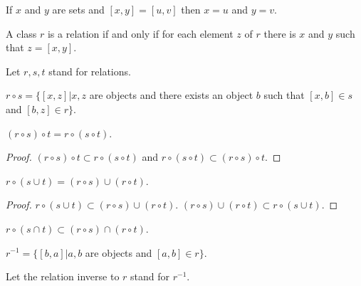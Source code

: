 \documentclass[a4paper,draft]{amsproc}
\begin{document}
\begin{forthel}
\begin{theorem}
If $x$ and $y$ are sets and $[x,y] = [u,v]$ then
$x = u$ and $y = v$.
\end{theorem}


\begin{definition} 
A class $r$ is a relation if and only if for each element $z$ of $r$
there is $x$ and $y$ such that $z = [x,y]$.
\end{definition}

Let $r, s, t$ stand for relations.

\begin{definition}
$r \circ s = \{[x,z] | x, z$ are objects and there exists an object $b$ 
such that $[x,b] \in s$ and $[b,z] \in r\}$. 
\end{definition}

\begin{theorem}
$(r \circ s) \circ t = r \circ (s \circ t)$.
\end{theorem}
\begin{proof}
$(r \circ s) \circ t \subset r \circ (s \circ t)$ and
$r \circ (s \circ t) \subset (r \circ s) \circ t$.
\end{proof}

\begin{theorem}
$r \circ (s \cup t) = (r \circ s) \cup (r \circ t)$.
\end{theorem}
\begin{proof}
$r \circ (s \cup t) \subset (r \circ s) \cup (r \circ t)$.
$(r \circ s) \cup (r \circ t) \subset r \circ (s \cup t)$.
\end{proof}

\begin{theorem}
$r \circ (s \cap t) \subset (r \circ s) \cap (r \circ t)$.
\end{theorem}

\begin{definition}
$r^{-1} = \{[b,a] | a, b$ are objects and $[a,b] \in r\}$.
\end{definition}
Let the relation inverse to $r$ stand for $r^{-1}$.


\end{forthel}
\end{document}
